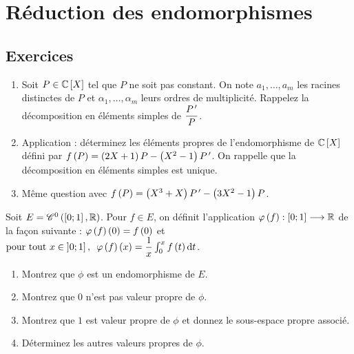 \chapter{Réduction des endomorphismes}

\minitoc

\section*{Exercices}

\legendeexercices

\begin{exoss}[Exercice 1]
\begin{enumerate}
    \item Soit \(P\in\poly[\C]\) tel que \(P\) ne soit pas constant. On note \(a_1,\dots,a_m\) les racines distinctes de \(P\) et \(\alpha_1,\dots,\alpha_m\) leurs ordres de multiplicité. Rappelez la décomposition en éléments simples de \(\dfrac{P^{\,\prime}}{P}\). \\
    \item Application : déterminez les éléments propres de l'endomorphisme de \(\poly[\C]\) défini par \(f\left(P\right)=\left(2X+1\right)P-\left(X^2-1\right)P^{\,\prime}\). On rappelle que la décomposition en éléments simples est unique. \\
    \item Même question avec \(f\left(P\right)=\left(X^3+X\right)P^{\,\prime}-\left(3X^2-1\right)P\).
\end{enumerate}
\end{exoss}



\begin{exoss}[Exercice 2]
Soit \(E=\mathscr{C}^{0}\left(\left[0;1\right],\mathbb{R}\right)\). Pour \(f\in E\), on définit l'application \(\varphi\left(f\right):\left[0;1\right]\longrightarrow\mathbb{R}\) de la façon suivante : \(\varphi\left(f\right)\left(0\right)=f\left(0\right)\) et \(\quantifs{\tpt x\in\intervei{0}{1}}\phi\paren{f}\paren{x}=\dfrac{1}{x}\int_0^xf\paren{t}\odif{t}\).

\begin{enumerate}
    \item Montrez que \(\phi\) est un endomorphisme de \(E\). \\
    \item Montrez que \(0\) n'est pas valeur propre de \(\phi\). \\
    \item Montrez que \(1\) est valeur propre de \(\phi\) et donnez le sous-espace propre associé. \\
    \item Déterminez les autres valeurs propres de \(\phi\).
\end{enumerate}
\end{exoss}



